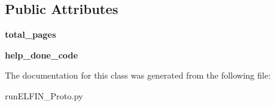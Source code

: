 \subsection*{Public Attributes}
\begin{DoxyCompactItemize}
\item 
\hypertarget{classrunELFIN__Proto_1_1HelpDialog_a51a912a78cbd4e7d2246873f4b15974f}{{\bfseries total\-\_\-pages}}\label{classrunELFIN__Proto_1_1HelpDialog_a51a912a78cbd4e7d2246873f4b15974f}

\item 
\hypertarget{classrunELFIN__Proto_1_1HelpDialog_aca88e773346b803b15fc06f179bbbe12}{{\bfseries help\-\_\-done\-\_\-code}}\label{classrunELFIN__Proto_1_1HelpDialog_aca88e773346b803b15fc06f179bbbe12}

\end{DoxyCompactItemize}


The documentation for this class was generated from the following file\-:\begin{DoxyCompactItemize}
\item 
run\-E\-L\-F\-I\-N\-\_\-\-Proto.\-py\end{DoxyCompactItemize}
